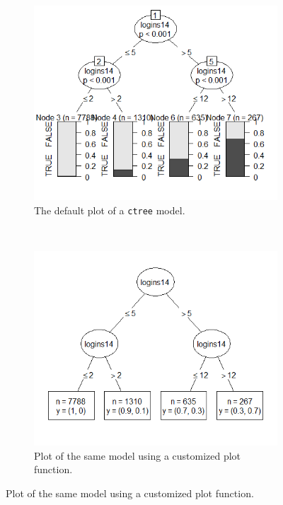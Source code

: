 \begin{figure}
	\centering
  \begin{subfigure}[b]{0.45\textwidth}
    \includegraphics[width=\textwidth]{img/plot_compare_ctree_0}
    \caption{The default plot of a \texttt{ctree} model.}
    \label{fig:plotcompare0}
  \end{subfigure}
  ~ %
  \begin{subfigure}[b]{0.45\textwidth}
    \includegraphics[width=\textwidth]{img/plot_compare_ctree_1}
    \caption{Plot of the same model using a customized plot function.}
    \label{fig:plotcompare1}
  \end{subfigure}



\end{figure}
